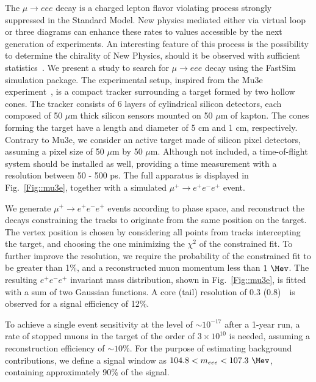 


The $\mu \rightarrow eee$ decay is a charged lepton flavor violating process strongly suppressed in the 
Standard Model. New physics mediated either via virtual loop or three diagrams can enhance these rates 
to values accessible by the next generation of experiments. An interesting feature of this process is 
the possibility to determine the chirality of New Physics, should it be observed with sufficient 
statistics~\cite{Okada:1999zk}. We present a study to search for $\mu \rightarrow eee$ decay using the FastSim 
simulation package. The experimental setup, inspired from the Mu3e experiment~\cite{Blondel:2013ia}, is a compact 
tracker surrounding a target formed by two hollow cones. The tracker consists of 6 layers of 
cylindrical silicon detectors, each composed of 50 $\mu$m thick silicon sensors mounted on 
50 $\mu$m of kapton. The cones forming the target have a length and diameter of 5 cm and 1 cm, 
respectively. Contrary to Mu3e, we consider an active target made of silicon pixel detectors, 
assuming a pixel size of 50 $\mu$m by 50 $\mu$m. Although not included, a time-of-flight system 
should be installed as well, providing a time measurement with a resolution between 50 - 500 ps. 
The full apparatus is displayed in Fig.~\ref{Fig::mu3e}, together with a simulated 
$\mu^+ \rightarrow e^+e^-e^+$ event.

We generate $\mu^+ \rightarrow e^+e^-e^+$ events according to phase space, and reconstruct the 
decays constraining the tracks to originate from the same position on the target. The vertex 
position is chosen by considering all points from tracks intercepting the target, and 
choosing the one minimizing the $\chi^2$ of the constrained fit. To further improve the 
resolution, we require the probability of the constrained fit to be greater than 1\%, and a 
reconstructed muon momentum less than $1 ~\Mev$. The resulting $e^+e^-e^+$ invariant mass 
distribution, shown in Fig.~\ref{Fig::mu3e}, is fitted with a sum of two Gaussian functions. A 
core (tail) resolution of 0.3 (0.8)~\Mev\ is observed for a signal efficiency of 12\%. 

To achieve a single event sensitivity at the level of $\sim 10^{-17}$ after a 1-year run, 
a rate of stopped muons in the target of the order of $3 \times 10^{10}$ is needed, assuming 
a reconstruction efficiency of $\sim10\%$. For the purpose of estimating background 
contributions, we define a signal window as $ 104.8 < m_{eee} < 107.3 ~\Mev$, containing 
approximately 90\% of the signal. 

